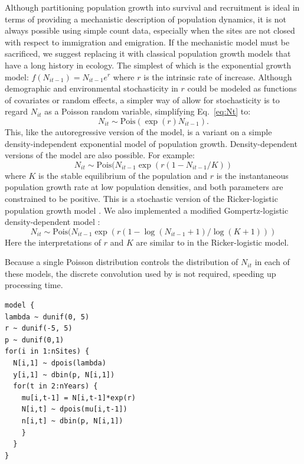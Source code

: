 \documentclass[12pt]{article}
\begin{document}
Although partitioning population growth into survival and recruitment
is ideal in terms of providing a mechanistic description of population
dynamics, it is not always possible using simple count data,
especially when the sites are not closed with respect to immigration
and emigration. %
If the mechanistic model must be sacrificed, we suggest replacing it
with classical population growth models that have a long history in
ecology. The simplest of which is the exponential growth
model: $f(N_{it-1}) = N_{it-1}e^r$ where $r$ is the intrinsic
rate of increase. Although demographic and environmental stochasticity
in $r$ could be modeled as functions of covariates or random effects, a
simpler way of allow for stochasticity is to regard $N_{it}$ as a Poisson random variable, simplifying
Eq.~\ref{eq:Nt} to:
\begin{equation}
  N_{it} \sim \text{Pois}(\exp(r)N_{it-1}).
\label{eq:exp}
\end{equation}
This,
like the autoregressive version of the model, is a variant on a simple
density-independent exponential model of population growth.
Density-dependent versions of the model are also possible.  For
example:
\begin{equation}
  N_{it} \sim \text{Pois}(N_{it-1}\exp(r(1-N_{it-1}/K))
\label{eq:rick}
\end{equation}
where $K$ is the stable equilibrium of the population and $r$ is
the
instantaneous population growth rate at low population
densities, and
both parameters are constrained to be positive. This is a
stochastic version
of the Ricker-logistic population growth model
\citep{ricker:1954}. We also
implemented a modified Gompertz-logistic density-dependent
model \citep{hart_gotelli:2011}:
\begin{equation}
N_{it} \sim
\text{Pois}(N_{it-1}\exp(r(1-\log(N_{it-1}+1)/\log(K+1)))
\label{eq:gomp}
\end{equation}
Here the interpretations of $r$ and $K$ are similar to in the
Ricker-logistic model.

Because a single Poisson distribution controls the
distribution of $N_{it}$ in each of these models, the discrete
convolution used by \citet{dail_madsen:2011} is not required,
speeding up processing time.

\begin{verbatim}
model {
lambda ~ dunif(0, 5)
r ~ dunif(-5, 5)
p ~ dunif(0,1)
for(i in 1:nSites) {
  N[i,1] ~ dpois(lambda)
  y[i,1] ~ dbin(p, N[i,1])
  for(t in 2:nYears) {
    mu[i,t-1] = N[i,t-1]*exp(r)
    N[i,t] ~ dpois(mu[i,t-1])
    n[i,t] ~ dbin(p, N[i,1])
    }
  }
}
\end{verbatim}
\end{document}
